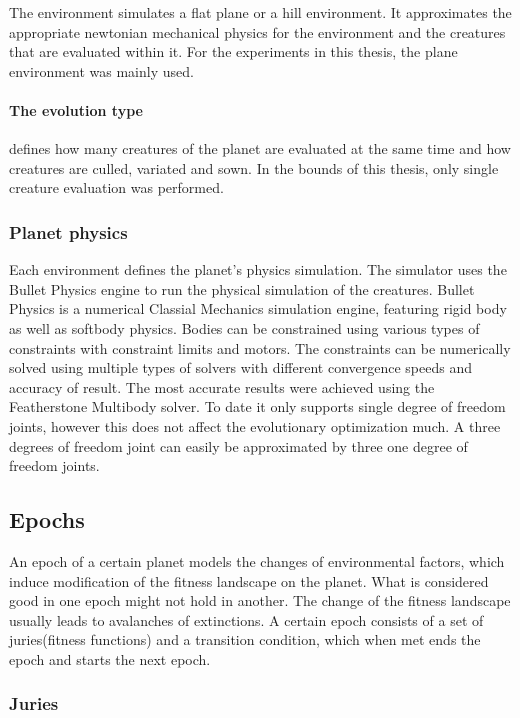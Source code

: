 \documentclass[main]{subfiles}
\begin{document}
The environment simulates a flat plane or a hill environment. It approximates the appropriate newtonian mechanical physics for the environment and the creatures that are evaluated within it. For the experiments in this thesis, the plane environment was mainly used.

\paragraph{The evolution type} defines how many creatures of the planet are evaluated at the same time and how creatures are culled, variated and sown. In the bounds of this thesis, only single creature evaluation was performed. 

\subsubsection{Planet physics}

Each environment defines the planet's physics simulation. The simulator uses the Bullet Physics engine\cite{bulletphysics} to run the physical simulation of the creatures. Bullet Physics is a numerical Classial Mechanics simulation engine, featuring rigid body as well as softbody physics. Bodies can be constrained using various types of constraints with constraint limits and motors. The constraints can be numerically solved using multiple types of solvers with different convergence speeds and accuracy of result. The most accurate results were achieved using the Featherstone Multibody solver. To date it only supports single degree of freedom joints, however this does not affect the evolutionary optimization much. A three degrees of freedom joint can easily be approximated by three one degree of freedom joints.

\subsection{Epochs}

An epoch of a certain planet models the changes of environmental factors, which induce modification of the fitness landscape on the planet. What is considered good in one epoch might not hold in another. The change of the fitness landscape usually leads to avalanches of extinctions. A certain epoch consists of a set of juries(fitness functions) and a transition condition, which when met ends the epoch and starts the next epoch.

\subsubsection{Juries}
\end{document}
